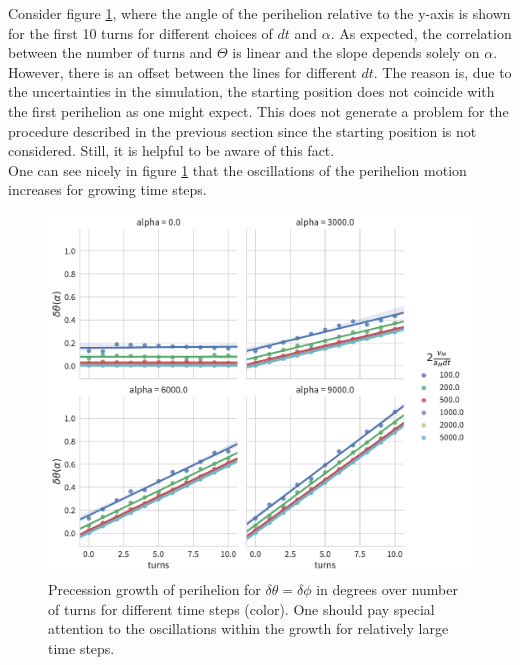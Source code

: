 \documentclass[12pt]{iopart}
\begin{document}
Consider figure \ref{fcc3}, where the angle of the perihelion relative to the y-axis is shown for the first 10 turns for different choices of $dt$ and $\alpha$. As expected, the correlation between the number of turns and $\Theta$ is linear and the slope depends solely on $\alpha$. However, there is an offset between the lines for different $dt$. The reason is, due to the uncertainties in the simulation, the starting position does not coincide with the first perihelion as one might expect. This does not generate a problem for the procedure described in the previous section
since the starting position is not considered. Still, it is helpful to be aware of this fact.\\
One can see nicely in figure \ref{fcc3} that the oscillations of the perihelion motion increases for growing time steps. 

\begin{figure}[htb]
	\centering
	\includegraphics[width=.7\textwidth]{figs/precession_growth.pdf}
	\caption{\label{fcc3}Precession growth of perihelion for $\delta\theta = \delta\phi$ in degrees over number of turns for different time steps (color).  One should pay special attention to the oscillations within the growth for relatively large time steps.}
\end{figure} 
\end{document}
